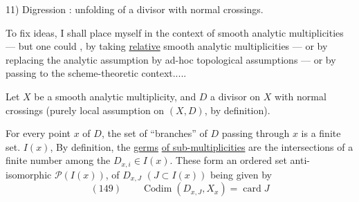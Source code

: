 11) Digression : unfolding of a divisor with normal crossings.

To fix ideas, I shall place myself in the context of smooth analytic multiplicities — but one could , by taking \uline{relative} smooth analytic multiplicities — or by replacing the analytic assumption by ad-hoc topological assumptions — or by passing to the scheme-theoretic context.....

Let $X$ be a smooth analytic multiplicity, and $D$ a divisor on $X$ with normal crossings (purely local assumption on $(X,D)$, by definition). 

For every point $x$ of $D$, the set of ``branches'' of $D$ passing through $x$ is a finite set. $I(x)$, By definition, the \uline{germs}  \uline{of sub-multiplicities}   are the intersections of a finite number  among the $D_{x,i}\in I(x)$.
These  form an ordered set  anti-isomorphic  $\mathcal P(I(x))$,   of $D_{x,J}$ $(J\subset I(x))$ being given by
\[
(149)\qquad \operatorname{Codim}(D_{x,J},X_x)=\operatorname{card}J
\]
